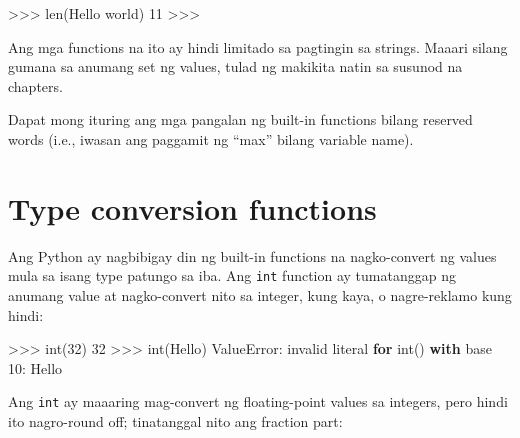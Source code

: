 \documentclass[10pt,]{book}
\newenvironment{Shaded}{}{}
\newcommand{\BuiltInTok}[1]{\textcolor[rgb]{0.00,0.50,0.00}{#1}}
\newcommand{\ControlFlowTok}[1]{\textcolor[rgb]{0.00,0.44,0.13}{\textbf{#1}}}
\newcommand{\DecValTok}[1]{\textcolor[rgb]{0.25,0.63,0.44}{#1}}
\newcommand{\NormalTok}[1]{#1}
\newcommand{\OperatorTok}[1]{\textcolor[rgb]{0.40,0.40,0.40}{#1}}
\newcommand{\PreprocessorTok}[1]{\textcolor[rgb]{0.74,0.48,0.00}{#1}}
\newcommand{\StringTok}[1]{\textcolor[rgb]{0.25,0.44,0.63}{#1}}
\begin{document}
\begin{Shaded}
\begin{Highlighting}[]
\OperatorTok{\textgreater{}\textgreater{}\textgreater{}} \BuiltInTok{len}\NormalTok{(}\StringTok{\textquotesingle{}Hello world\textquotesingle{}}\NormalTok{)}
\DecValTok{11}
\OperatorTok{\textgreater{}\textgreater{}\textgreater{}}
\end{Highlighting}
\end{Shaded}

Ang mga functions na ito ay hindi limitado sa pagtingin sa strings.
Maaari silang gumana sa anumang set ng values, tulad ng makikita natin
sa susunod na chapters.

Dapat mong ituring ang mga pangalan ng built-in functions bilang
reserved words (i.e., iwasan ang paggamit ng ``max'' bilang variable
name).

\section{Type conversion functions}\label{type-conversion-functions}

 

Ang Python ay nagbibigay din ng built-in functions na nagko-convert ng
values mula sa isang type patungo sa iba. Ang \texttt{int} function ay
tumatanggap ng anumang value at nagko-convert nito sa integer, kung
kaya, o nagre-reklamo kung hindi:

 

\begin{Shaded}
\begin{Highlighting}[]
\OperatorTok{\textgreater{}\textgreater{}\textgreater{}} \BuiltInTok{int}\NormalTok{(}\StringTok{\textquotesingle{}32\textquotesingle{}}\NormalTok{)}
\DecValTok{32}
\OperatorTok{\textgreater{}\textgreater{}\textgreater{}} \BuiltInTok{int}\NormalTok{(}\StringTok{\textquotesingle{}Hello\textquotesingle{}}\NormalTok{)}
\PreprocessorTok{ValueError}\NormalTok{: invalid literal }\ControlFlowTok{for} \BuiltInTok{int}\NormalTok{() }\ControlFlowTok{with}\NormalTok{ base }\DecValTok{10}\NormalTok{: }\StringTok{\textquotesingle{}Hello\textquotesingle{}}
\end{Highlighting}
\end{Shaded}

Ang \texttt{int} ay maaaring mag-convert ng floating-point values sa
integers, pero hindi ito nagro-round off; tinatanggal nito ang fraction
part:
\end{document}
